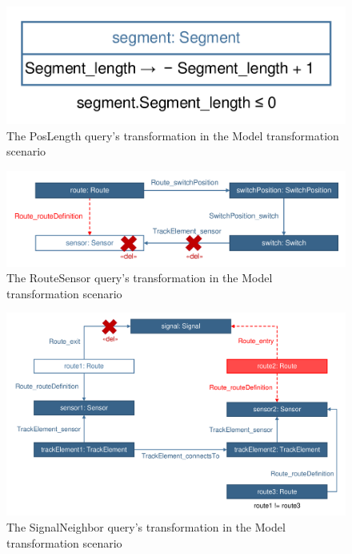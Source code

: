 \begin{figure}[!Htb]
	\centering
	\includegraphics[scale=0.4]{figures/trainbenchmark-transformation-xform-poslength}
	\caption{The \textsf{PosLength} query's transformation in the Model transformation scenario}
	\label{fig:trainbenchmark-transformation-xform-poslength}
\end{figure}

\begin{figure}[!Htb]
	\centering
	\includegraphics[scale=0.4]{figures/trainbenchmark-transformation-xform-routesensor}
	\caption{The \textsf{RouteSensor} query's transformation in the Model transformation scenario}
	\label{fig:trainbenchmark-transformation-xform-routesensor}
\end{figure}

\begin{figure}[!Htb]
	\centering
	\includegraphics[scale=0.4]{figures/trainbenchmark-transformation-xform-signalneighbor}
	\caption{The \textsf{SignalNeighbor} query's transformation in the Model transformation scenario}
	\label{fig:trainbenchmark-transformation-xform-signalneighbor}
\end{figure}

